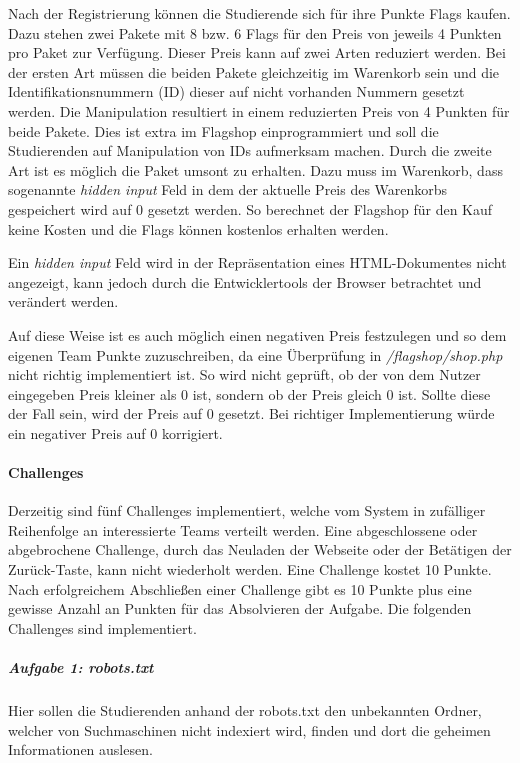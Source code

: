 Nach der Registrierung können die Studierende sich für ihre Punkte Flags kaufen. Dazu stehen zwei Pakete mit 8 bzw. 6 Flags für den Preis von jeweils 4 Punkten pro Paket zur Verfügung. Dieser Preis kann auf zwei Arten reduziert werden. 
Bei der ersten Art müssen die beiden Pakete gleichzeitig im Warenkorb sein und die Identifikationsnummern (ID) dieser auf nicht vorhanden Nummern gesetzt werden. Die Manipulation resultiert in einem reduzierten Preis von 4 Punkten für beide Pakete. Dies ist extra im Flagshop einprogrammiert und soll die Studierenden auf Manipulation von IDs aufmerksam machen.
Durch die zweite Art ist es möglich die Paket umsont zu erhalten. Dazu muss im Warenkorb, dass sogenannte \textit{hidden input} Feld in dem der aktuelle Preis des Warenkorbs gespeichert wird auf 0 gesetzt werden. So berechnet der Flagshop für den Kauf keine Kosten und die Flags können kostenlos erhalten werden.\cite[S. 63]{abtsUeberarbeitungUndErweiterung2016}

Ein \textit{hidden input} Feld wird in der Repräsentation eines HTML-Dokumentes nicht angezeigt, kann jedoch durch die Entwicklertools der Browser betrachtet und verändert werden. \cite{w3schoolsHTMLHiddenInput}

Auf diese Weise ist es auch möglich einen negativen Preis festzulegen und so dem eigenen Team Punkte zuzuschreiben, da eine Überprüfung in \textit{/flagshop/shop.php} nicht richtig implementiert ist. So wird nicht geprüft, ob der von dem Nutzer eingegeben Preis kleiner als 0 ist, sondern ob der Preis gleich 0 ist. Sollte diese der Fall sein, wird der Preis auf 0 gesetzt. Bei richtiger Implementierung würde ein negativer Preis auf 0 korrigiert.

\paragraph{Challenges} \label{para:Challenges}
Derzeitig sind fünf Challenges implementiert, welche vom System in zufälliger Reihenfolge an interessierte Teams verteilt werden. Eine abgeschlossene oder abgebrochene Challenge, durch das Neuladen der Webseite oder der Betätigen der Zurück-Taste, kann nicht wiederholt werden. Eine Challenge kostet 10 Punkte. Nach erfolgreichem Abschließen einer Challenge gibt es 10 Punkte plus eine gewisse Anzahl an Punkten für das Absolvieren der Aufgabe. Die folgenden Challenges sind implementiert\cite[S.19-20]{abtsUeberarbeitungUndErweiterung2016}.

\subparagraph{Aufgabe 1: robots.txt}\label{subpara:Aufgabe_1_robots.txt}
Hier sollen die Studierenden anhand der robots.txt den unbekannten Ordner, welcher von Suchmaschinen nicht indexiert wird, finden und dort die geheimen Informationen auslesen.


